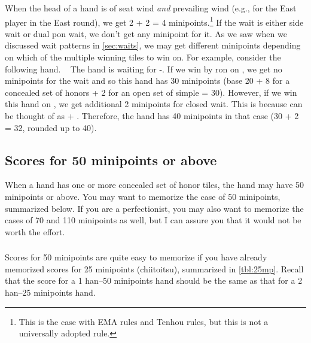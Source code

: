 When the head of a hand is of seat wind \emph{and} prevailing wind (e.g., {\LARGE\dong} for the East player in the East round), we get 2 + 2 = 4 minipoints.\footnote{This is the case with EMA rules and {\jap Tenhou} rules, but this is not a universally adopted rule.} 
If the wait is either side wait or dual {\jap pon} wait, we don't get any minipoint for it.
As we saw when we discussed wait patterns in \ref{sec:waits}, we may get different minipoints depending on which of the multiple winning tiles to win on. 
For example, consider the following hand.
\bp
{}\zhong\zhong\zhong~
\ep
The hand is waiting for {\LARGE{}-}. If we win by {\jap ron} on {\LARGE{}}, we get no minipoints for the wait and so this hand has 30 minipoints (base 20 + 8 for a concealed set of honors + 2 for an open set of simple = 30). However, if we win this hand on {\LARGE{}}, we get additional 2 minipoints for closed wait. This is because {\LARGE{}} can be thought of as {\LARGE{} + }. Therefore, the hand has 40 minipoints in that case (30 + 2 = 32, rounded up to 40). 

\bigskip
\subsection{Scores for 50 minipoints or above}
\bigskip
When a hand has one or more concealed set of honor tiles, the hand may have 50 minipoints or above. You may want to memorize the case of 50 minipoints, summarized below. 
If you are a perfectionist, you may also want to memorize the cases of 70 and 110 minipoints as well, but I can assure you that it would not be worth the effort. 

\subsubsection{}
\noindent Scores for 50 minipoints are quite easy to memorize if you have already memorized scores for 25 minipoints ({\jap chiitoitsu}), summarized in \ref{tbl:25mp}. Recall that the score for a 1 {\jap han}--50 minipoints hand should be the same as that for a 2 {\jap han}--25 minipoints hand.

